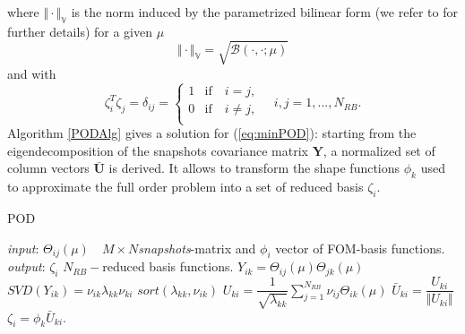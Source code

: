 \documentclass[3p]{article}
\begin{document}
where $\Vert\cdot\Vert_{\mathbb{V}}$ is the norm induced by the parametrized bilinear form (we refer to \cite{Rozza2009} for further details) for a given $\mu$
\begin{equation}
\Vert\cdot\Vert_{\mathbb{V}} = \sqrt{\mathcal{B}(\cdot, \cdot; \mu)}
\end{equation}
and with
\begin{equation}
\zeta_{i}^{T}\zeta_{j} = \delta_{ij} =
    \begin{cases}
      1 &\text{if}\quad i=j, \\
      0 &\text{if}\quad i \neq j, \\
    \end{cases}
   \quad i,j=1,...,N_{RB}.
\end{equation}
\indent Algorithm \ref{PODAlg} gives a solution for (\ref{eq:minPOD}): starting from the eigendecomposition of the snapshots covariance matrix $\mathbf{Y}$, a normalized set of column vectors $\mathbf{\bar{U}}$ is derived. It allows to transform the shape functions $\phi_{k}$ used to approximate the full order problem into a set of reduced basis $\zeta_{i}$. 
\begin{algorithm}
\caption{POD}
\begin{algorithmic}[1]
\State \textit{input}: $\Theta_{i j}(\mu) \quad M\times N $\textit{snapshots}-matrix and $\phi_{i}$ vector of FOM-basis functions.
\State \textit{output}: $\zeta_{i}$ $N_{RB}-$reduced basis functions.
\State $Y_{ik}=\Theta_{ij}(\mu)\Theta_{jk}(\mu)$ 
\State $SVD(Y_{ik})=\nu_{ik}\lambda_{kk}\nu_{ki}$
\State $sort(\lambda_{kk}, \nu_{ik})$
\EndIf
\State $U_{ki}=\dfrac{1}{\sqrt{\lambda_{kk}}}\sum_{j=1}^{N_{RB}}\nu_{ij}\Theta_{ik}(\mu)$ 
\State $\bar{U}_{ki}=\dfrac{U_{ki}}{\Vert U_{ki}\Vert}$ 
\State $\zeta_{i}=\phi_{k}\bar{U}_{ki}$.
\end{algorithmic}
\label{PODAlg}
\end{algorithm}

\end{document}
